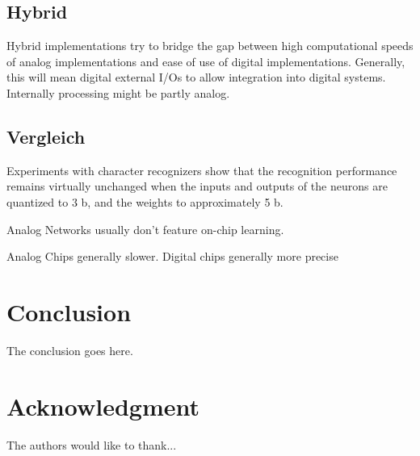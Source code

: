 \documentclass[conference]{IEEEtran}
\begin{document}
    \subsection{Hybrid}

    Hybrid implementations try to bridge the gap between high computational speeds of analog implementations and ease of use of digital implementations.
    Generally, this will mean digital external I/Os to allow integration into digital systems.
    Internally processing might be partly analog.


    \subsection{Vergleich}
    Experiments with character recognizers show that the recognition performance remains virtually unchanged when the inputs and outputs of
    the neurons are quantized to 3 b, and the weights to approximately 5 b. \cite{boser1991analog}

    Analog Networks usually don't feature on-chip learning. \cite{ms1990digital}

    Analog Chips generally slower.
    Digital chips generally more precise

    \section{Conclusion}
    The conclusion goes here.







    \section*{Acknowledgment}


    The authors would like to thank...






\end{document}
